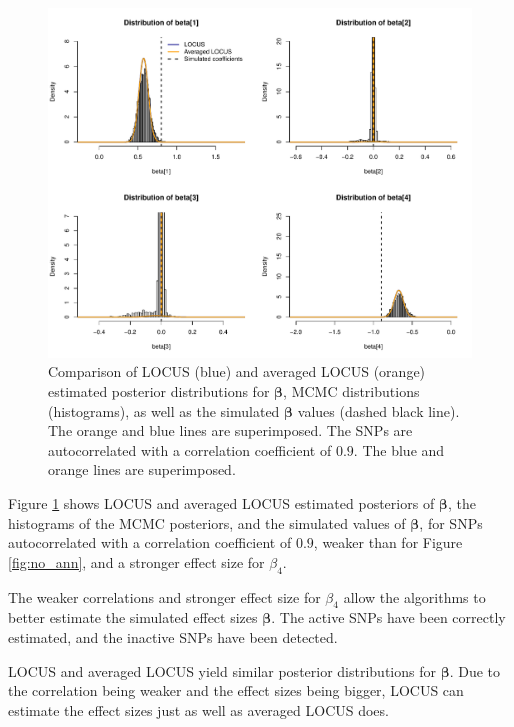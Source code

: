 \documentclass[a4paper, 11pt]{report}
\numberwithin{equation}{chapter}
\begin{document}
\begin{figure}[h]
\centering
\includegraphics[width=\textwidth, bb=0 0 9.8in 8.07in]{images/MCMC_weakcorr.pdf}
\caption{\label{fig:weakCorr} Comparison of LOCUS (blue) and averaged LOCUS (orange) estimated posterior distributions for $\boldsymbol{\beta}$, MCMC distributions (histograms), as well as the simulated $\boldsymbol{\beta}$ values (dashed black line). The orange and blue lines are superimposed. The SNPs are autocorrelated with a correlation coefficient of $0.9$. The blue and orange lines are superimposed.}
\end{figure}

Figure \ref{fig:weakCorr} shows LOCUS and averaged LOCUS estimated posteriors of $\boldsymbol{\beta}$, the histograms of the MCMC posteriors, and the simulated values of $\boldsymbol{\beta}$, for SNPs autocorrelated with a correlation coefficient of $0.9$, weaker than for Figure \ref{fig:no_ann}, and a stronger effect size for $\beta_4$.

The weaker correlations and stronger effect size for $\beta_4$ allow the algorithms to better estimate the simulated effect sizes $\boldsymbol{\beta}$. The active SNPs have been correctly estimated, and the inactive SNPs have been detected.

LOCUS and averaged LOCUS yield similar posterior distributions for $\boldsymbol{\beta}$. Due to the correlation being weaker and the effect sizes being bigger, LOCUS can estimate the effect sizes just as well as averaged LOCUS does. 
\end{document}
